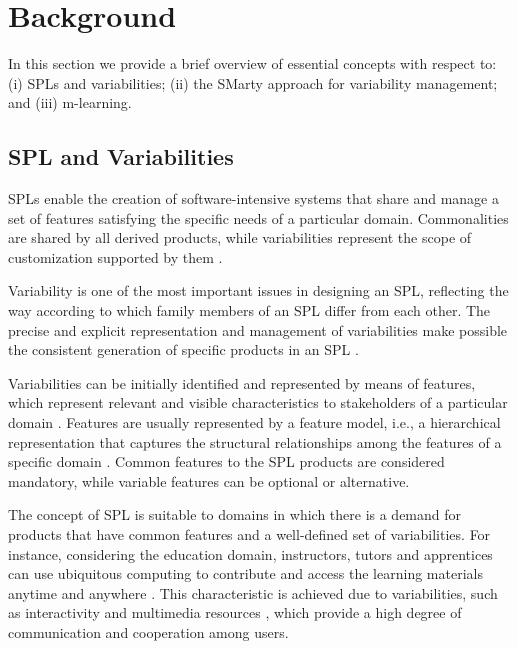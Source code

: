 \section{Background}\label{section2}

In this section we provide a brief overview of essential concepts with respect to: (i) SPLs and variabilities; (ii) the SMarty approach for variability management; and (iii) m-learning.

\subsection{SPL and Variabilities}

SPLs enable the creation of software-intensive systems that share and manage a set of features satisfying the specific needs of a particular domain. Commonalities are shared by all derived products, while variabilities represent the scope of customization supported by them \cite{bockle05,vanderlinden07}.


Variability is one of the most important issues in designing an SPL, reflecting the way according to which family members of an SPL differ from each other. The precise and explicit representation and management of variabilities make possible the consistent generation of specific products in an SPL \cite{chen11, capilla13}. 

Variabilities can be initially identified and represented by means of features, which represent relevant and visible characteristics to stakeholders of a particular domain \cite{bosch01}. Features are usually represented by a feature model, i.e., a hierarchical representation that captures the structural relationships among the features of a specific domain \cite{bockle05, vanderlinden07}. Common features to the SPL products are considered mandatory, while variable features can be optional or alternative. %

The concept of SPL is suitable to domains in which there is a demand for products that have common features and a well-defined set of variabilities. For instance, considering the education domain, instructors, tutors and apprentices can use ubiquitous computing to contribute and access the learning materials anytime and anywhere \cite{kukulska05}. This characteristic is achieved due to variabilities, such as interactivity and multimedia resources \cite{falvojr14a, falvojr14b}, which provide a high degree of communication and cooperation among users.

